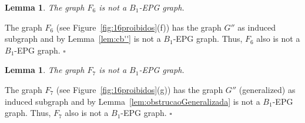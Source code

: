 \documentclass[9pt]{entcs}
\newtheorem{lema}[thm]{Lemma}%
\begin{document}




\begin{lema}\label{lem:f6}
The graph $F_{6}$ is not a $B_1$-EPG graph. 
\end{lema}

\begin{pf}
The graph $F_6$ (see Figure~\ref{fig:16proibidos}(f)) has the graph $G''$ as induced subgraph and by Lemma~\ref{lem:cb''} is not a $B_1$-EPG graph. Thus, $F_6$ also is not a $B_1$-EPG graph.
%
 $\square$\end{pf} 

\begin{lema}\label{lem:f7}
The graph $F_{7}$ is not a  $B_1$-EPG graph. 
\end{lema}

\begin{pf}
The graph $F_7$ (see Figure~\ref{fig:16proibidos}(g)) has the graph $G''$ (generalized) as induced subgraph and by Lemma~\ref{lem:obstrucaoGeneralizada} is not a $B_1$-EPG graph. Thus, $F_7$ also is not a $B_1$-EPG graph.
%
 $\square$\end{pf} 
\end{document}
